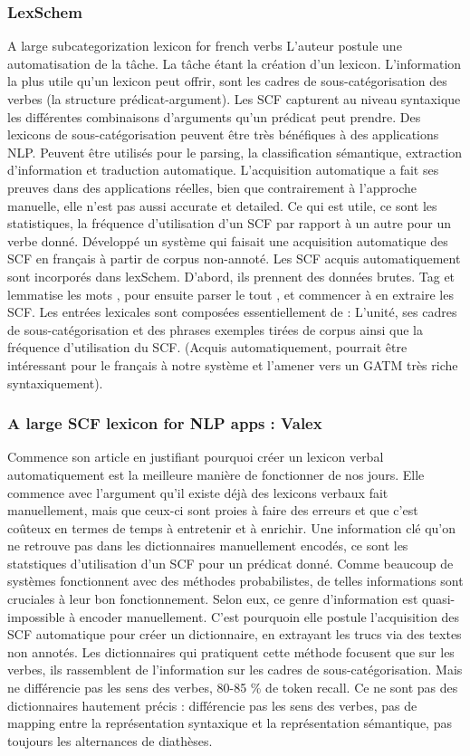 \subsubsection{LexSchem}
A large subcategorization lexicon for french verbs \citep{MESSIANT08.142} L'auteur postule une automatisation de la tâche. La tâche étant la création d'un lexicon. L'information la plus utile qu'un lexicon peut offrir, sont les cadres de sous-catégorisation des verbes (la structure prédicat-argument). Les SCF capturent au niveau syntaxique les différentes combinaisons d'arguments qu'un prédicat peut prendre. Des lexicons de sous-catégorisation peuvent être très bénéfiques à des applications NLP. Peuvent être utilisés pour le parsing, la classification sémantique, extraction d'information et traduction automatique. L'acquisition automatique a fait ses preuves dans des applications réelles, bien que contrairement à l'approche manuelle, elle n'est pas aussi accurate et detailed. Ce qui est utile, ce sont les statistiques, la fréquence d'utilisation d'un SCF par rapport à un autre pour un verbe donné. Développé un système qui faisait une acquisition automatique des SCF en français à partir de corpus non-annoté. Les SCF acquis automatiquement sont incorporés dans lexSchem. D'abord, ils prennent des données brutes. Tag et lemmatise les mots , pour ensuite parser le tout , et commencer à en extraire les SCF. Les entrées lexicales sont composées essentiellement de : L'unité, ses cadres de sous-catégorisation et des phrases exemples tirées de corpus ainsi que la fréquence d'utilisation du SCF. (Acquis automatiquement, pourrait être intéressant pour le français à notre système et l'amener vers un GATM très riche syntaxiquement).

\subsubsection{A large SCF lexicon for NLP apps : Valex} \citep{Korhonenlargesubcategorizationlexicon2006}
Commence son article en justifiant pourquoi créer un lexicon verbal automatiquement est la meilleure manière de fonctionner de nos jours. Elle commence avec l'argument qu'il existe déjà des lexicons verbaux fait manuellement, mais que ceux-ci sont proies à faire des erreurs et que c'est coûteux en termes de temps à entretenir et à enrichir. Une information clé qu'on ne retrouve pas dans les dictionnaires manuellement encodés, ce sont les statstiques d'utilisation d'un SCF pour un prédicat donné. Comme beaucoup de systèmes fonctionnent avec des méthodes probabilistes, de telles informations sont cruciales à leur bon fonctionnement. Selon eux, ce genre d'information est quasi-impossible à encoder manuellement. C'est pourquoin elle postule l'acquisition des SCF automatique pour créer un dictionnaire, en extrayant les trucs via des textes non annotés. Les dictionnaires qui pratiquent cette méthode focusent que sur les verbes, ils rassemblent de l'information sur les cadres de sous-catégorisation. Mais ne différencie pas les sens des verbes, 80-85 \% de token recall. Ce ne sont pas des dictionnaires hautement précis : différencie pas les sens des verbes, pas de mapping entre la représentation syntaxique et la représentation sémantique, pas toujours les alternances de diathèses.

